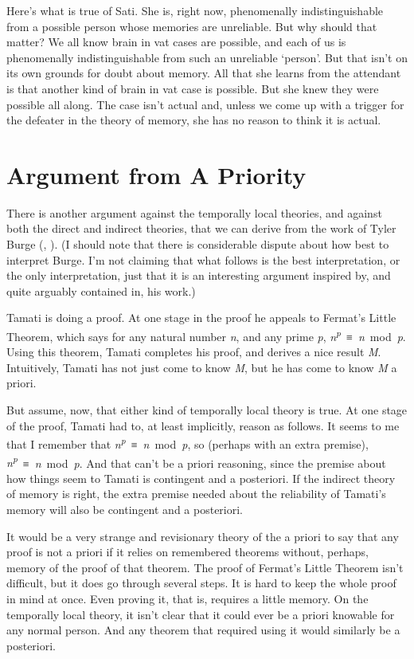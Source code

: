 \documentclass[
  10pt,
  letterpaper,
  DIV=11,
  numbers=noendperiod,
  twoside]{scrartcl}
\begin{document}
Here's what is true of Sati. She is, right now, phenomenally
indistinguishable from a possible person whose memories are unreliable.
But why should that matter? We all know brain in vat cases are possible,
and each of us is phenomenally indistinguishable from such an unreliable
`person'. But that isn't on its own grounds for doubt about memory. All
that she learns from the attendant is that another kind of brain in vat
case is possible. But she knew they were possible all along. The case
isn't actual and, unless we come up with a trigger for the defeater in
the theory of memory, she has no reason to think it is actual.

\section{Argument from A Priority}\label{argumentfromapriority}

There is another argument against the temporally local theories, and
against both the direct and indirect theories, that we can derive from
the work of Tyler Burge (,
). (I should note that there is
considerable dispute about how best to interpret Burge. I'm not claiming
that what follows is the best interpretation, or the only
interpretation, just that it is an interesting argument inspired by, and
quite arguably contained in, his work.)

Tamati is doing a proof. At one stage in the proof he appeals to
Fermat's Little Theorem, which says for any natural number \emph{n}, and
any prime \emph{p}, \emph{n\textsuperscript{p}}~≡~\emph{n}~mod~\emph{p}.
Using this theorem, Tamati completes his proof, and derives a nice
result \emph{M}. Intuitively, Tamati has not just come to know \emph{M},
but he has come to know \emph{M} a priori.

But assume, now, that either kind of temporally local theory is true. At
one stage of the proof, Tamati had to, at least implicitly, reason as
follows. It seems to me that I remember that
\emph{n\textsuperscript{p}}~≡~\emph{n}~mod~\emph{p}, so (perhaps with an
extra premise), \emph{n\textsuperscript{p}}~≡~\emph{n}~mod~\emph{p}. And
that can't be a priori reasoning, since the premise about how things
seem to Tamati is contingent and a posteriori. If the indirect theory of
memory is right, the extra premise needed about the reliability of
Tamati's memory will also be contingent and a posteriori.

It would be a very strange and revisionary theory of the a priori to say
that any proof is not a priori if it relies on remembered theorems
without, perhaps, memory of the proof of that theorem. The proof of
Fermat's Little Theorem isn't difficult, but it does go through several
steps. It is hard to keep the whole proof in mind at once. Even proving
it, that is, requires a little memory. On the temporally local theory,
it isn't clear that it could ever be a priori knowable for any normal
person. And any theorem that required using it would similarly be a
posteriori.
\end{document}
